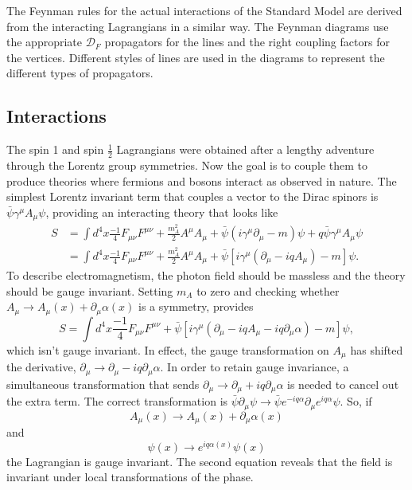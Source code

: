 \documentclass[12pt]{article}
\begin{document}
The Feynman rules for the actual interactions of the Standard Model are derived from the interacting Lagrangians in a similar way. The Feynman diagrams use the appropriate $\mathcal{D}_F$ propagators for the lines and the right coupling factors for the vertices. Different styles of lines are used in the diagrams to represent the different types of propagators. 

\subsection{Interactions}

The spin 1 and spin $\frac{1}{2}$ Lagrangians were obtained after a lengthy adventure through the Lorentz group symmetries. Now the goal is to couple them to produce theories where fermions and bosons interact as observed in nature. The simplest Lorentz invariant term that couples a vector to the Dirac spinors is $\bar{\psi}\gamma^\mu A_\mu \psi$, providing an interacting theory that looks like 
\begin{equation}
\begin{split}
S &= \int d^4x \frac{-1}{4}F_{\mu\nu}F^{\mu\nu} + \frac{m_A^2}{2} A^\mu A_\mu + \bar{\psi}\left(i\gamma^\mu\partial_\mu - m\right)\psi + q\bar{\psi}\gamma^\mu A_\mu \psi \\
&= \int d^4x \frac{-1}{4}F_{\mu\nu}F^{\mu\nu} + \frac{m_A^2}{2} A^\mu A_\mu + \bar{\psi}\left[i\gamma^\mu\left(\partial_\mu - iqA_\mu\right)- m \right]\psi. 
\end{split}
\end{equation}
To describe electromagnetism, the photon field should be massless and the theory should be gauge invariant. Setting $m_A$ to zero and checking whether $A_\mu \rightarrow A_\mu(x) + \partial_\mu\alpha(x)$ is a symmetry, provides  
\begin{equation}
S = \int d^4x \frac{-1}{4}F_{\mu\nu}F^{\mu\nu} + \bar{\psi}\left[i\gamma^\mu\left(\partial_\mu - iqA_\mu - iq\partial_\mu\alpha\right)- m \right]\psi, 
\end{equation}
which isn't gauge invariant. In effect, the gauge transformation on $A_\mu$ has shifted the derivative, $\partial_\mu \rightarrow \partial_\mu - iq\partial_\mu\alpha$. In order to retain gauge invariance, a simultaneous transformation that sends $\partial_\mu \rightarrow \partial_\mu + iq\partial_\mu\alpha$ is needed to cancel out the extra term. The correct transformation is $\bar{\psi}\partial_\mu\psi \rightarrow \bar{\psi} e^{-iq\alpha} \partial_\mu e^{iq\alpha} \psi$. So, if 
\begin{equation}
A_\mu(x) \rightarrow A_\mu(x) + \partial_\mu\alpha(x)
\end{equation}
and
\begin{equation}
\psi(x) \rightarrow e^{iq\alpha(x)}\psi(x) 
\end{equation}
the Lagrangian is gauge invariant. The second equation reveals that the field is invariant under local transformations of the phase. 
\end{document}
